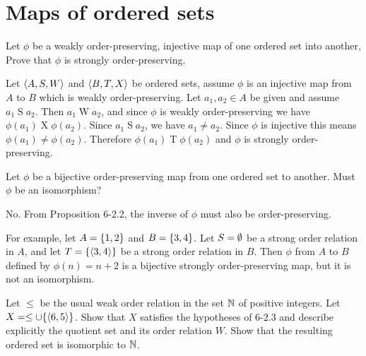 \section{Maps of ordered sets}
\begin{exercise}
Let $\phi$ be a weakly order-preserving, injective map of one ordered set into another,
Prove that $\phi$ is strongly order-preserving.
\end{exercise}

\begin{solution}
Let $\left\langle A,S,W\right\rangle$ and $\left\langle B,T,X\right\rangle$ be ordered sets, assume $\phi$ is an injective map
from $A$ to $B$ which is weakly order-preserving.
Let $a_1,a_2\in A$ be given and assume $a_1\mathrel S a_2$.
Then $a_1\mathrel W a_2$, and since $\phi$ is weakly order-preserving we have
$\phi(a_1)\mathrel X \phi(a_2)$.
Since $a_1\mathrel S a_2$, we have $a_1\neq a_2$.
Since $\phi$ is injective this means $\phi(a_1)\neq \phi(a_2)$.
Therefore $\phi(a_1)\mathrel T \phi(a_2)$ and $\phi$ is strongly order-preserving.
\end{solution}

\begin{exercise}
Let $\phi$ be a bijective order-preserving map from one ordered set to another. Must
$\phi$ be an isomorphism?
\end{exercise}

\begin{solution}
No. From Proposition 6-2.2, the inverse of $\phi$ must also be order-preserving.

For example, let $A=\left\{1,2\right\}$ and $B=\left\{3,4\right\}$.
Let $S=\emptyset$ be a strong order relation in $A$, and let $T=\left\{\left\langle3,4\right\rangle\right\}$ be a strong
order relation in $B$.
Then $\phi$ from $A$ to $B$ defined by $\phi(n)=n+2$ is a bijective strongly order-preserving map,
but it is not an isomorphism.
\end{solution}

\begin{exercise}
Let $\leq$ be the usual weak order relation in the set $\mathbb{N}$ of positive integers.
Let $X=\leq \cup \set{\aprn{6,5}}$. Show that $X$ satisfies the hypotheses of 6-2.3 and describe
explicitly the quotient set and its order relation $W$. Show that the resulting ordered set
is isomorphic to $\mathbb{N}$.
\end{exercise}

